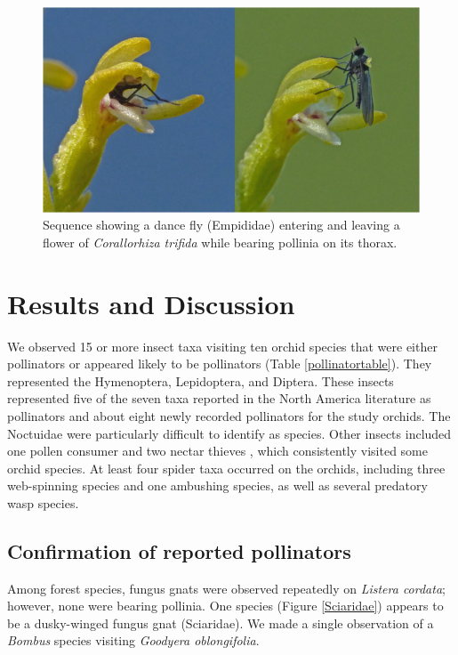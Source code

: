 \begin{multicols}{2}
\begin{figure}[H]
\begin{center}
\vspace{2mm}
\includegraphics[width=\textwidth]{img/Corallorhiza_trifida_Empididae.jpg}
\caption{Sequence showing a dance fly (Empididae) entering and leaving a flower of \emph{Corallorhiza trifida} while bearing pollinia on its thorax.}
\label{Corallorhiza_trifida_Empididae}
\end{center}
\end{figure}

\section{Results and Discussion}

We observed 15 or more insect taxa visiting ten orchid species that were
either pollinators or appeared likely to be pollinators (Table \ref{pollinatortable}). They
represented the Hymenoptera, Lepidoptera, and Diptera. These insects
represented five of the seven taxa reported in the North America
literature as pollinators and about eight newly recorded pollinators for
the study orchids. The Noctuidae were particularly difficult to identify
as species. Other insects included one pollen consumer and two nectar
thieves \citep{Inouye1980}, which consistently visited some orchid species.
At least four spider taxa occurred on the orchids, including three
web-spinning species and one ambushing species, as well as several
predatory wasp species.

\subsection{Confirmation of reported pollinators}

Among forest species, fungus gnats were observed repeatedly on
\emph{Listera cordata}; however, none were bearing pollinia. One species
(Figure \ref{Sciaridae}) appears to be a dusky-winged fungus gnat (Sciaridae).
We made a single observation of a \emph{Bombus} species visiting \emph{Goodyera
oblongifolia}.



\end{multicols}
